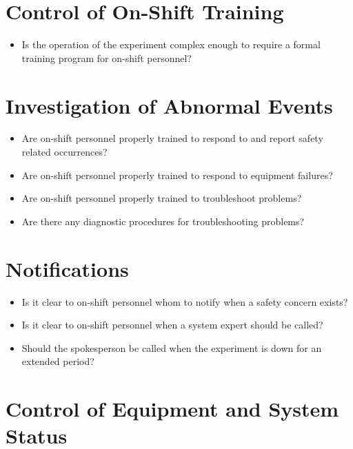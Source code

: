 \section{Control of On-Shift Training}

\begin{itemize}
\item   Is the operation of the experiment complex enough to require a formal training 
program for on-shift personnel?

\end{itemize}

\section{Investigation of Abnormal Events}


\begin{itemize}
\item   Are on-shift personnel properly trained to respond to and report safety related 
occurrences?

\item   Are on-shift personnel properly trained to respond to equipment failures?

\item   Are on-shift personnel properly trained to troubleshoot problems?

\item   Are there any diagnostic procedures for troubleshooting problems?

\end{itemize}

\section{Notifications}


\begin{itemize}
\item   Is it clear to on-shift personnel whom to notify when a safety concern exists?

\item   Is it clear to on-shift personnel when a system expert should be called?

\item   Should the spokesperson be called when the experiment is down for an extended 
period?

\end{itemize}

\section{Control of Equipment and System Status}



